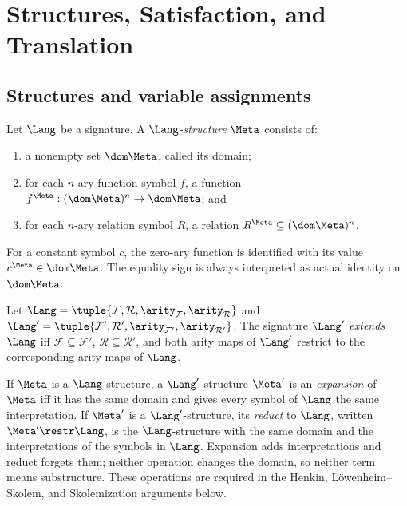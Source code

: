 \chapter{Structures, Satisfaction, and Translation}
\label{ch:fol-semantics}

\section{Structures and variable assignments}
\label{sec:fol-semantics-01}

\begin{definition}
Let \(\Lang\) be a signature.  A \emph{\(\Lang\)-structure}
\(\Meta\) consists of:
\begin{enumerate}
  \item a nonempty set \(\dom\Meta\), called its domain;
  \item for each \(n\)-ary function symbol \(f\), a function
        \(f^{\Meta}:(\dom\Meta)^{n}\to\dom\Meta\); and
  \item for each \(n\)-ary relation symbol \(R\), a relation
        \(R^{\Meta}\subseteq(\dom\Meta)^{n}\).
\end{enumerate}
For a constant symbol \(c\), the zero-ary function is identified with its
value \(c^{\Meta}\in\dom\Meta\).  The equality sign is always interpreted
as actual identity on \(\dom\Meta\).
\end{definition}

\begin{definition}
Let \(\Lang=\tuple{\mathcal F,\mathcal R,\arity_{\mathcal F},
\arity_{\mathcal R}}\) and
\(\Lang'=\tuple{\mathcal F',\mathcal R',\arity_{\mathcal F'},
\arity_{\mathcal R'}}\).  The signature \(\Lang'\) \emph{extends}
\(\Lang\) iff \(\mathcal F\subseteq\mathcal F'\),
\(\mathcal R\subseteq\mathcal R'\), and both arity maps of \(\Lang'\)
restrict to the corresponding arity maps of \(\Lang\).

If \(\Meta\) is a \(\Lang\)-structure, a \(\Lang'\)-structure
\(\Meta'\) is an \emph{expansion} of \(\Meta\) iff it has the same domain
and gives every symbol of \(\Lang\) the same interpretation.  If
\(\Meta'\) is a \(\Lang'\)-structure, its \emph{reduct} to \(\Lang\),
written \(\Meta'\restr\Lang\), is the \(\Lang\)-structure with the same
domain and the interpretations of the symbols in \(\Lang\).  Expansion adds
interpretations and reduct forgets them; neither operation changes the domain,
so neither term means substructure.  These operations are required in the
Henkin, L\"owenheim--Skolem, and Skolemization arguments below.
\end{definition}

